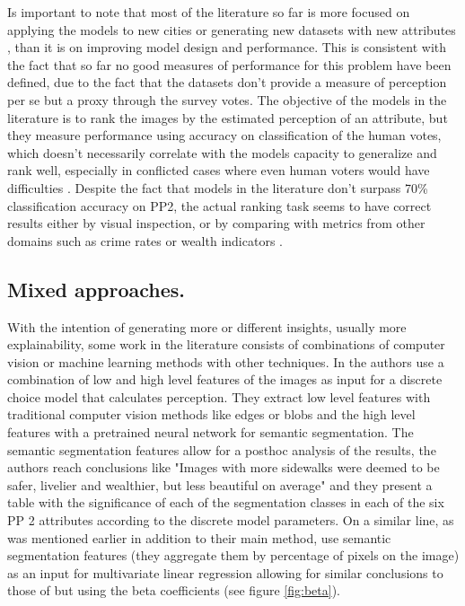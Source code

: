 Is important to note that most of the literature so far is more focused on applying the models to new cities
\cite{zhang_measuring, santani, costa_lisbon, rossetti} or generating new datasets with new attributes
\cite{santani, zhang_uncovering}, than it is on improving model  design and performance.
This is consistent with the fact that so far no good measures of performance for this problem have been defined,
due to the fact that the datasets don't provide a measure of perception per se but a proxy through the survey votes.
The objective of the models in the literature is to rank the images by the estimated perception of an attribute, but
they measure  performance using accuracy on classification of the human votes, which doesn't necessarily correlate with the
models capacity to generalize and rank well, especially in conflicted cases where even human voters
would have difficulties \cite{zhang_measuring}. Despite the fact that models in the literature don't surpass 70\%
classification  accuracy on  PP2, the actual ranking task seems to have correct results either by visual inspection,
or by comparing with metrics from other domains such as crime rates or wealth indicators \cite{rossetti,zhang_measuring,tamara_judgments}.


\subsection{Mixed approaches.}
\label{section:mixed}

With the intention of generating more or different insights, usually more explainability, some
work in the literature consists of combinations of computer vision or machine learning methods
with other techniques. In  the authors use a combination of low and high level features
of the images as input for a discrete choice model that calculates perception. They extract low level features
with traditional computer vision methods like edges or blobs and the high level features with a pretrained
neural network for semantic segmentation. The semantic segmentation features allow for a posthoc analysis of
the results, the authors reach conclusions like "Images with more sidewalks were deemed to be
safer, livelier and wealthier, but less beautiful on average" and they present a table with the significance
of each of the segmentation classes in each of the six PP 2 attributes according to the discrete model parameters.
On a similar line, as was mentioned earlier  in addition to their main method, use
semantic segmentation features (they aggregate them by percentage of pixels on the image)
as an input for multivariate linear regression allowing for similar conclusions to those of 
but using the beta coefficients (see figure \ref{fig:beta}).

